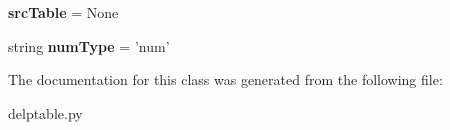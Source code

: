\begin{DoxyCompactItemize}
\item 
\hypertarget{classdelptable_1_1Row_af877cb46fab7f9fa56f18ef536f3ab58}{
{\bfseries srcTable} = None}
\label{classdelptable_1_1Row_af877cb46fab7f9fa56f18ef536f3ab58}

\item 
\hypertarget{classdelptable_1_1Row_a3e12053149fbd0e1bf94cc7e2b7584ac}{
string {\bfseries numType} = 'num'}
\label{classdelptable_1_1Row_a3e12053149fbd0e1bf94cc7e2b7584ac}

\end{DoxyCompactItemize}


The documentation for this class was generated from the following file:\begin{DoxyCompactItemize}
\item 
delptable.py\end{DoxyCompactItemize}
